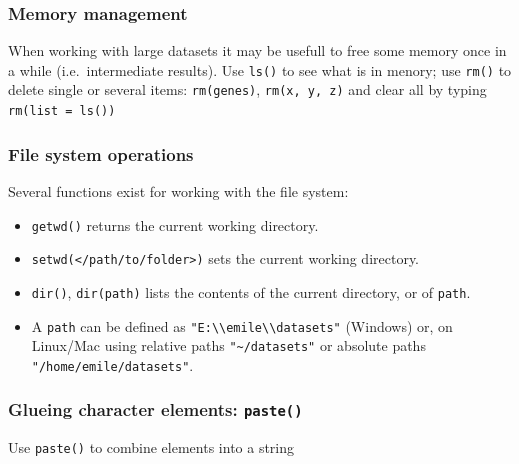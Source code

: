 \documentclass[]{book}
\providecommand{\tightlist}{%
  \setlength{\itemsep}{0pt}\setlength{\parskip}{0pt}}
\begin{document}
\hypertarget{memory-management}{%
\subsubsection*{Memory management}\label{memory-management}}

When working with large datasets it may be usefull to free some memory once in a while (i.e.~intermediate results). Use \texttt{ls()} to see what is in menory; use \texttt{rm()} to delete single or several items: \texttt{rm(genes)}, \texttt{rm(x,\ y,\ z)} and clear all by typing \texttt{rm(list\ =\ ls())}

\hypertarget{file-system-operations}{%
\subsubsection*{File system operations}\label{file-system-operations}}

Several functions exist for working with the file system:

\begin{itemize}
\tightlist
\item
  \texttt{getwd()} returns the current working directory.
\item
  \texttt{setwd(\textless{}/path/to/folder\textgreater{})} sets the current working directory.
\item
  \texttt{dir()}, \texttt{dir(path)} lists the contents of the current directory, or of \texttt{path}.
\item
  A \texttt{path} can be defined as \texttt{"E:\textbackslash{}\textbackslash{}emile\textbackslash{}\textbackslash{}datasets"} (Windows) or, on Linux/Mac using relative paths \texttt{"\textasciitilde{}/datasets"} or absolute paths \texttt{"/home/emile/datasets"}.
\end{itemize}

\hypertarget{glueing-character-elements-paste}{%
\subsubsection*{\texorpdfstring{Glueing character elements: \texttt{paste()}}{Glueing character elements: paste()}}\label{glueing-character-elements-paste}}

Use \texttt{paste()} to combine elements into a string
\end{document}
